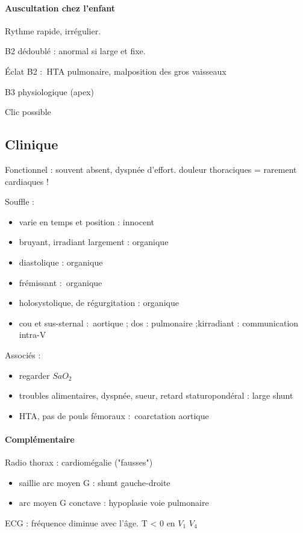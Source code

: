 \documentclass{article}
\begin{document}
\paragraph{Auscultation chez l'enfant} Rythme rapide, irrégulier.

B2 dédoublé : anormal si large et fixe.

Éclat B2 : HTA pulmonaire, malposition des gros vaisseaux

B3 physiologique (apex)

Clic possible

\subsection{Clinique}
Fonctionnel : souvent absent, dyspnée d'effort. \danger douleur thoraciques =
rarement cardiaques !

Souffle :
\begin{itemize}
  \item varie en temps et position : innocent
  \item bruyant, irradiant largement : organique
  \item diastolique : organique
  \item frémissant : organique
  \item holosystolique, de régurgitation : organique
  \item cou et sus-sternal : aortique ; dos : pulmonaire ;kirradiant :
    communication intra-V
\end{itemize}
Associés : 
\begin{itemize}
  \item regarder $SaO_2$
  \item troubles alimentaires, dyspnée, sueur, retard staturopondéral : large
    shunt
  \item HTA, pas de pouls fémoraux : coarctation aortique
\end{itemize}

\paragraph{Complémentaire}
Radio thorax : cardiomégalie (\danger "fausses")
\begin{itemize}
  \item saillie arc moyen G : shunt gauche-droite
  \item arc moyen G conctave : hypoplasie voie pulmonaire
\end{itemize}

ECG : fréquence diminue avec l'âge. T < 0 en $V_1$ $V_4$
\end{document}
